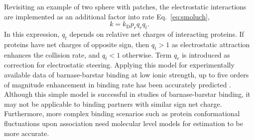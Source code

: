 \documentclass[../talant.diss.submit.tex]{subfiles}
\begin{document}
Revisiting an example of two sphere with patches, the electrostatic interactions
are implemented as an additional factor into rate Eq.~\ref{eq:smoluch}\cite{janin:97},
%
\begin{equation}
  \label{eq:rate_mode_ele}
  k = k_{\mathrm{D}} p_r q_r q_t .
\end{equation}
%
In this expression, $q_t$ depends on relative net charges of interacting
proteins.  If proteins have net charges of opposite sign, then $q_t > 1$ as
electrostatic attraction enhances the collision rate, and $q_t < 1$
otherwise. Term $q_r$ is introduced as correction for electrostatic
steering. Applying this model for experimentally available
data\cite{schreiber:96r} of barnase-barstar binding at low ionic strength, up to
five orders of magnitude enhancement in binding rate has been accurately
predicted \cite{janin:97}. Although this simple model is successful in studies
of barnase-barstar binding, it may not be applicable to binding partners with
similar sign net charge.  Furthermore, more complex binding scenarios such as
protein conformational fluctuations upon association need molecular level models
for estimation to be more accurate.
\end{document}
